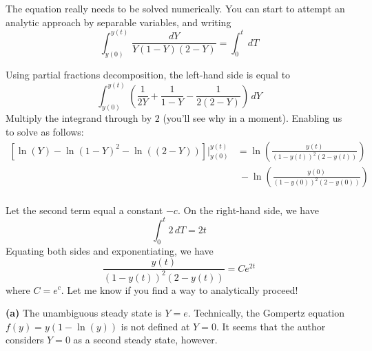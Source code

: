 \documentclass[a4paper]{article}
\begin{document}
The equation really needs to be solved numerically. You can start to attempt an analytic approach by separable variables, and writing
\[
	\int^{y \!\left( t \right) }_{y \!\left( 0 \right) } \frac{dY}{Y \!\left( 1 - Y \right) \!\left( 2 - Y  \right) } = \int^{t}_{0}  \, dT
\]

Using partial fractions decomposition, the left-hand side is equal to
\[
	\int^{y \!\left( t \right) }_{y \!\left( 0 \right) } \!\left(  \frac{1}{2Y} + \frac{1}{1 - Y} - \frac{1}{2 \!\left( 2 - Y \right) }\right) \, dY 
\]
Multiply the integrand through by \(2\) (you'll see why in a moment). Enabling us to solve as follows:
\begin{align*}
	\left[ \ln\left( Y \right) - \ln\left( 1 - Y \right)^{2} - \ln\left( \!\left( 2 - Y \right) \right) \right]  \Biggr|^{y \!\left( t \right)}_{y \!\left( 0 \right) } & = \ln\left( \frac{y \!\left( t \right)}{\!\left( 1 - y \!\left( t \right)  \right)^{2} \!\left( 2 - y \!\left( t \right)  \right)} \right) \\ 
 	  & \ - \ln\left( \frac{y \!\left( 0 \right)}{\!\left( 1 - y \!\left( 0 \right)  \right)^{2} \!\left( 2 - y \!\left( 0 \right)  \right) } \right) \\ 
\end{align*}

Let the second term equal a constant \(-c\). On the right-hand side, we have
\[
	\int^{t}_{0} 2 \, dT = 2t 
\]
Equating both sides and exponentiating, we have
\[
	\frac{y \!\left( t \right) }{\!\left( 1 - y \!\left( t \right)  \right)^{2} \!\left( 2 - y \!\left( t \right)  \right) } = Ce^{2t}
\]
where \(C = e^{c}\). Let me know if you find a way to analytically proceed! 

\vspace{12pt}


\textbf{(a)} The unambiguous steady state is \(Y = e\). Technically, the Gompertz equation \(f \!\left( y \right) = y \!\left( 1 - \ln\left( y \right) \right) \) is not defined at \(Y = 0\). It seems that the author considers \(Y = 0\) as a second steady state, however.
\end{document}

